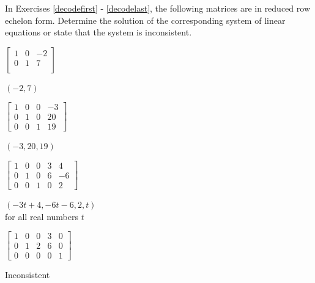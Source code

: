 \documentclass{ximera}
\begin{document}
\begin{question}
In Exercises \ref{decodefirst} - \ref{decodelast}, the following matrices are in reduced row echelon form.  Determine the solution of the corresponding system of linear equations or state that the system is inconsistent.  

\begin{problem}\label{decodefirst}
$\left[ \begin{array}{rr|r} 
1 & 0 & -2 \\ 
0 & 1 & 7  \\ 
\end{array} \right]$

\begin{solution}
$(-2, 7)$
\end{solution}
\end{problem}

\begin{problem}
$\left[ \begin{array}{rrr|r} 
1 & 0 & 0 & -3 \\ 
0 & 1 & 0 & 20 \\ 
0 & 0 & 1 & 19  
\end{array} \right]$

\begin{solution}
$(-3, 20, 19)$
\end{solution}
\end{problem} 

\begin{problem}
$\left[ \begin{array}{rrrr|r} 
1 & 0 & 0 & 3 & 4 \\ 
0 & 1 & 0 & 6 & -6 \\ 
0 & 0 & 1 & 0 & 2 
\end{array} \right]$

\begin{solution}
$(-3t + 4, -6t - 6, 2, t)$ \\
for all real numbers $t$
\end{solution}
\end{problem}

\begin{problem}
$\left[ \begin{array}{rrrr|r} 
1 & 0 & 0 & 3 & 0 \\ 
0 & 1 & 2 & 6 & 0 \\ 
0 & 0 & 0 & 0 & 1 
\end{array} \right]$

\begin{solution}
Inconsistent
\end{solution}
\end{problem}


\end{question}
\end{document}
